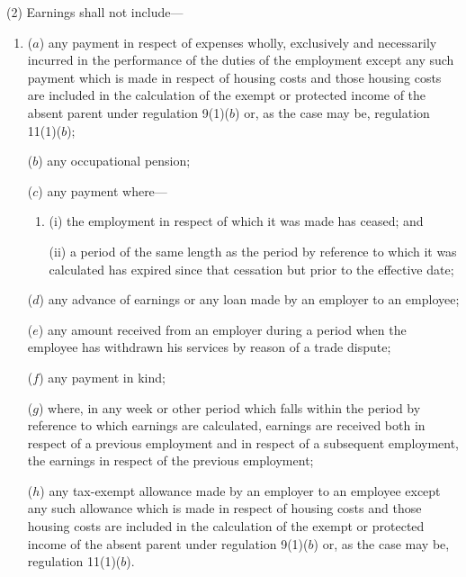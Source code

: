 \documentclass[12pt,a4paper]{article}
\begin{document}
(2) Earnings shall not include—
\begin{enumerate}\item[]
($a$) any payment in respect of expenses wholly, exclusively and necessarily incurred in the performance of the duties of the employment
except any such payment which is made in respect of housing costs and those housing costs are included in the calculation of the exempt or protected income of the absent parent under regulation 9(1)($b$) or, as the case may be, regulation 11(1)($b$);  %

($b$) any occupational pension;

($c$) any payment where—
\begin{enumerate}\item[]
(i) the employment in respect of which it was made has ceased; and

(ii) a period of the same length as the period by reference to which it was calculated has expired since that cessation but prior to the effective date;
\end{enumerate}

($d$) any advance of earnings or any loan made by an employer to an employee;

($e$) any amount received from an employer during a period when the employee has withdrawn his services by reason of a trade dispute;

($f$) any payment in kind;

($g$) where, in any week or other period which falls within the period by reference to which earnings are calculated, earnings are received both in respect of a previous employment and in respect of a subsequent employment, the earnings in respect of the previous employment;

($h$) any tax-exempt allowance made by an employer to an employee
except any such allowance which is made in respect of housing costs and those housing costs are included in the calculation of the exempt or protected income of the absent parent under regulation 9(1)($b$) or, as the case may be, regulation 11(1)($b$).  %
\end{enumerate}
\end{document}
